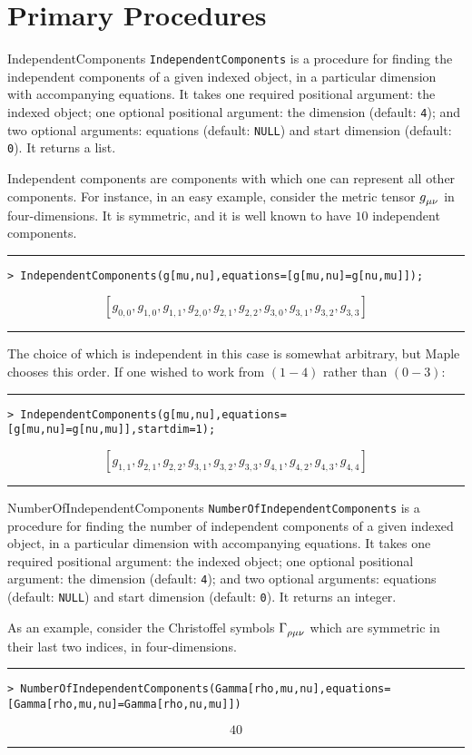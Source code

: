 \documentclass{article}
\begin{document}
\section{Primary Procedures}
\begin{macro}{IndependentComponents}
\verb~IndependentComponents~ is a procedure for finding the independent components of a given indexed object, in a particular dimension with accompanying equations. It takes one required positional argument: the indexed object; one optional positional argument: the dimension (default: \verb~4~); and two optional arguments: equations (default: \verb~NULL~) and start dimension (default: \verb~0~). It returns a list.

Independent components are components with which one can represent all other components. For instance, in an easy example, consider the metric tensor $\tensor{g}{_\mu_\nu}$ in four-dimensions. It is symmetric, and it is well known to have $10$ independent components.
\newline\rule{\linewidth}{0.4pt}
\begin{verbatim}
> IndependentComponents(g[mu,nu],equations=[g[mu,nu]=g[nu,mu]]);
\end{verbatim}
\[
[g_{0,0}, g_{1,0}, g_{1,1}, g_{2,0}, g_{2,1}, g_{2,2}, g_{3,0}, 
g_{3,1}, g_{3,2}, g_{3,3}]
\]
\newline\rule{\linewidth}{0.4pt}
The choice of which is independent in this case is somewhat arbitrary, but Maple chooses this order. If one wished to work from $(1-4)$ rather than $(0-3)$:
 \newline\rule{\linewidth}{0.4pt}
\begin{verbatim}
> IndependentComponents(g[mu,nu],equations=[g[mu,nu]=g[nu,mu]],startdim=1);
\end{verbatim}
\[
[g_{1,1}, g_{2,1}, g_{2,2}, g_{3,1}, g_{3,2}, g_{3,3}, g_{4,1}, 
g_{4,2}, g_{4,3}, g_{4,4}]
\]
\newline\rule{\linewidth}{0.4pt}
\end{macro}

\begin{macro}{NumberOfIndependentComponents}
\verb~NumberOfIndependentComponents~ is a procedure for finding the number of independent components of a given indexed object, in a particular dimension with accompanying equations. It takes one required positional argument: the indexed object; one optional positional argument: the dimension (default: \verb~4~); and two optional arguments: equations (default: \verb~NULL~) and start dimension (default: \verb~0~). It returns an integer.

As an example, consider the Christoffel symbols $\tensor{\Gamma}{_\rho_\mu_\nu}$ which are symmetric in their last two indices, in four-dimensions.
\newline\rule{\linewidth}{0.4pt}
\begin{verbatim}
> NumberOfIndependentComponents(Gamma[rho,mu,nu],equations=[Gamma[rho,mu,nu]=Gamma[rho,nu,mu]])
\end{verbatim}
\[
40
\]
\newline\rule{\linewidth}{0.4pt}
\end{macro}
\end{document}
